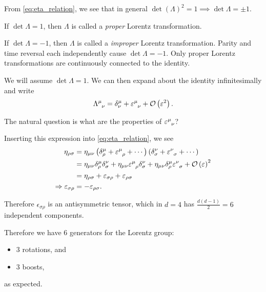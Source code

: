 \begin{note}
    From \cref{eq:eta_relation}, we see that in general $\det \left( \Lambda \right)^2 = 1 \implies \det \Lambda = \pm 1$.

    If $\det \Lambda = 1$, then $\Lambda$ is called a \textit{proper} Lorentz transformation.

    If $\det \Lambda = - 1$, then $\Lambda$ is called a \textit{improper} Lorentz transformation. Parity and time reversal each independently cause $\det \Lambda = - 1$. Only proper Lorentz transformations are continuously connected to the identity.
\end{note}

We will assume $\det \Lambda = 1$. We can then expand about the identity infinitesimally and write
\begin{align}
    \tensor{\Lambda}{^{\mu}_\nu} = \delta^{\mu}_\nu + \tensor{\epsilon}{^{\mu}_\nu}  + \mathcal{O}\left( \epsilon^2 \right) 
.\end{align}

The natural question is what are the properties of $\tensor{\epsilon}{^{\mu}_\nu}$?

Inserting this expression into \cref{eq:eta_relation}, we see
\begin{align}
    \eta_{\rho \sigma} &= \eta_{\mu \nu} \left( \delta^{\mu}_\rho + \tensor{\epsilon}{^{\mu}_\rho} + \cdots \right)  \left( \delta^{\nu}_{\sigma} + \tensor{\epsilon}{^{\nu}_{\sigma}} + \cdots \right) \nonumber  \\
    &= \eta_{\mu \nu} \delta^{\mu}_{\rho} \delta^{\nu}_{\sigma} + \eta_{\mu \nu} \tensor{\epsilon}{^{\mu}_\rho} \delta^{\nu}_{\sigma} + \eta_{\mu \nu} \delta^{\mu}_{\rho} \tensor{\epsilon}{^{\nu}_{\sigma}} + \mathcal{O} \left( \epsilon \right)^2  \nonumber \\
    &= \eta_{\rho \sigma} + \epsilon_{\sigma \rho} + \epsilon_{\rho \sigma} \nonumber \\
    \implies \epsilon_{\sigma \rho} &= - \epsilon_{\rho \sigma}
.\end{align}

Therefore $\epsilon_{\sigma \rho}$ is an antisymmetric tensor, which in $d= 4$ has $\frac{d \left( d - 1 \right) }{2} = 6$ independent components.

Therefore we have $6$ generators for the Lorentz group:
\begin{itemize}
    \item 3 rotations, and
    \item 3 boosts,
\end{itemize}
as expected.

